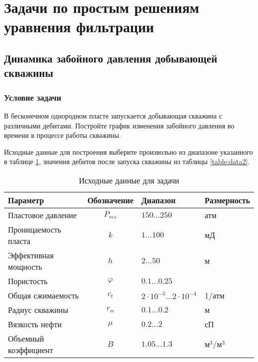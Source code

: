 
\section{Задачи по простым решениям уравнения фильтрации}

\subsection{Динамика забойного давления добывающей скважины}

\subsubsection{Условие задачи}

В бесконечном однородном пласте запускается добывающая скважина с различными дебитами. 
Постройте график изменения забойного давления во времени в процессе работы скважины.

Исходные данные для построения выберите произвольно из диапазоне указанного в таблице \ref{table:data1}, значения дебитов после запуска скважины из таблицы \ref{table:data2}. 

\begin{table}[h!]
	\ttabbox
	{
		\caption{Исходные данные для задачи}
		\label{table:data1}
	}
	{
		\begin{tabular}{|l|c|l|l|}
			\hline
		\rowcolor{lightgray}	Параметр& Обозначение &Диапазон &Размерность \\
			\hline
			Пластовое давление&  $P_{res} $&$ 150 \dots 250$ &атм \\
			\hline
			Проницаемость пласта &$k $&$ 1 \dots 100$& мД  \\
			\hline
			Эффективная мощность & $h $&$ 2\dots50$ &м  \\
			\hline
			Пористость & $\varphi $&$ 0.1 \dots 0.25$&  \\
			\hline
			Общая сжимаемость& $c_{t} $&$ 2\cdot 10^{-5} \dots2\cdot 10^{-4} $ & 1/атм  \\
			\hline
			Радиус скважины &$r_{w} $&$ 0.1\dots0.2 $& м  \\
			\hline
			Вязкость нефти& $\mu $&$ 0.2\dots2$& сП  \\
			\hline
			Объемный коэффициент   &$B $&$ 1.05\dots 1.3$& м$^3$/м$^3$  \\
			\hline
		\end{tabular}
	
	}
\end{table}


